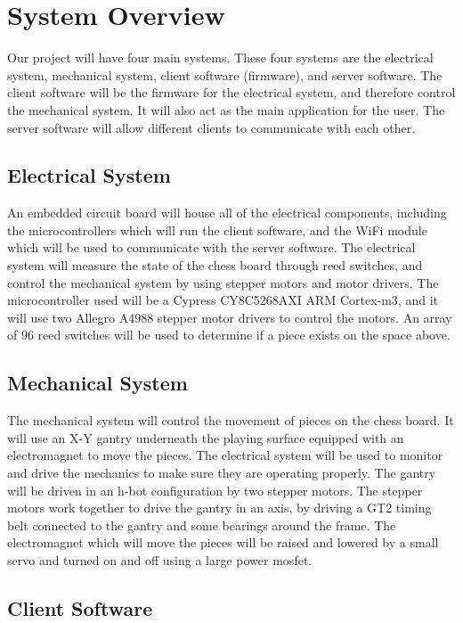 \documentclass{article}
\begin{document}
\section*{System Overview}
\indent

Our project will have four main systems. These four systems are the electrical system, mechanical system, client software (firmware), and server software. The client software will be the firmware for the electrical system, and therefore control the mechanical system. It will also act as the main application for the user. The server software will allow different clients to communicate with each other.

\subsection*{Electrical System}
\indent

An embedded circuit board will house all of the electrical components, including the microcontrollers which will run the client software, and the WiFi module which will be used to communicate with the server software. The electrical system will measure the state of the chess board through reed switches, and control the mechanical system by using stepper motors and motor drivers. The microcontroller used will be a Cypress CY8C5268AXI ARM Cortex-m3, and it will use two Allegro A4988 stepper motor drivers to control the motors. An array of 96 reed switches will be used to determine if a piece exists on the space above.

\subsection*{Mechanical System}
\indent

The mechanical system will control the movement of pieces on the chess board. It will use an X-Y gantry underneath the playing surface equipped with an electromagnet to move the pieces. The electrical system will be used to monitor and drive the mechanics to make sure they are operating properly. The gantry will be driven in an h-bot configuration by two stepper motors. The stepper motors work together to drive the gantry in an axis, by driving a GT2 timing belt connected to the gantry and some bearings around the frame. The electromagnet which will move the pieces will be raised and lowered by a small servo and turned on and off using a large power mosfet.

\subsection*{Client Software}
\indent
\end{document}
